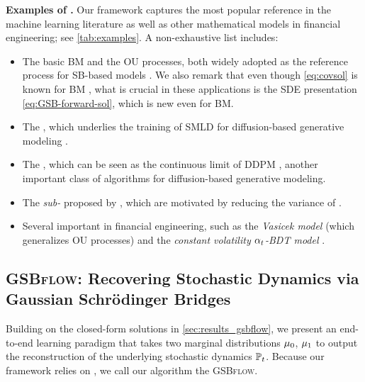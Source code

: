 \textbf{Examples of .}
Our framework captures the most popular reference  in the machine learning literature as well as other mathematical models in financial engineering; see \cref{tab:examples}. %
A non-exhaustive list includes:
\begin{itemize}[leftmargin=.5cm,itemsep=.01cm,topsep=0cm]
\item The basic \acrlong{BM} and the \acrfull{OU} processes, both widely adopted as the reference process for \acrshort{SB}-based models \citep{de2021simulating, de2021diffusion, lavenant2021towards, vargas2021solving, wang2021deep}. We also remark that even though \eqref{eq:covsol} is known for \acrshort{BM} \citep{mallasto2021entropy}, what is crucial in these applications is the \acrshort{SDE} presentation \eqref{eq:GSB-forward-sol}, which is new even for \acrshort{BM}.
\item The , which underlies the training of \acrfull{SMLD} for diffusion-based generative modeling \citep{huang2021variational, song2019generative, song2020score}.
\item The , which can be seen as the continuous limit of \acrfull{DDPM} \citep{ho2020denoising, sohl2015deep, song2020score}, another important class of algorithms for diffusion-based generative modeling.
\item The \emph{sub-} proposed by \citep{song2020score}, which are motivated by reducing the variance of .
\item Several important  in financial engineering, such as the \emph{Vasicek model} (which generalizes \acrshort{OU} processes) and the \emph{constant volatility $\alpha_{ t }$-\acrfull{BDT} model} \citep{platen2010numerical}. 
\end{itemize}

\subsection{\textsc{GSBflow}: Recovering Stochastic Dynamics via Gaussian Schr{\"o}dinger Bridges}

Building on the closed-form solutions in \cref{sec:results_gsbflow}, we present an end-to-end learning paradigm that takes two marginal distributions $\mu_0$, $\mu_1$ to output the reconstruction of the underlying stochastic dynamics $\mathbb{P}_{{t}}$. Because our framework relies on , we call our algorithm the \textsc{GSBflow}. \\

